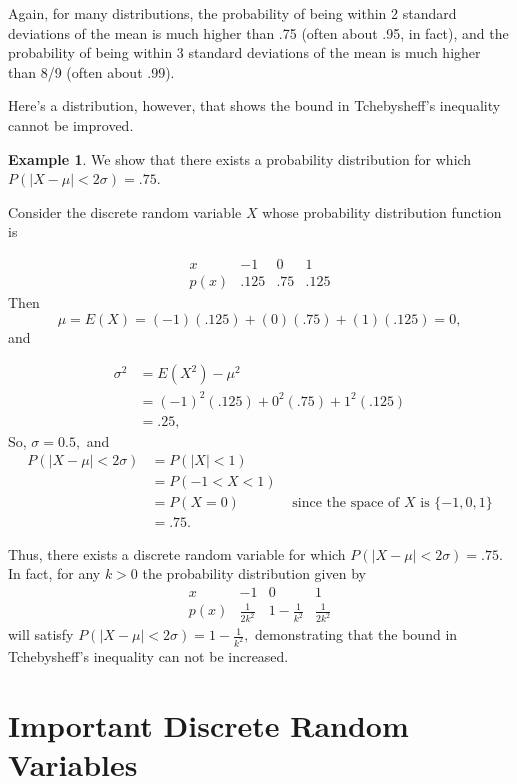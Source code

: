 \documentclass[
]{book}
\theoremstyle{definition}
\theoremstyle{definition}
\newtheorem{example}{Example}[chapter]
\theoremstyle{definition}
\theoremstyle{definition}
\theoremstyle{remark}
\begin{document}
Again, for many distributions, the probability of being within 2 standard deviations of the mean is much higher than .75 (often about .95, in fact), and the probability of being within 3 standard deviations of the mean is much higher than 8/9 (often about .99).

Here's a distribution, however, that shows the bound in Tchebysheff's inequality cannot be improved.

\begin{example}
\protect\hypertarget{exm:tcheby-best-bound}{}\label{exm:tcheby-best-bound}We show that there exists a probability distribution for which \(P(|X-\mu|<2\sigma) = .75\).

Consider the discrete random variable \(X\) whose probability distribution function is

\[
\begin{array}{c|c|c|c}
x   &  -1 &  0 &  1   \\ \hline
p(x) & .125 & .75 & .125 
\end{array}
\]
Then \[\mu = E(X) = (-1)(.125) + (0)(.75) + (1)(.125) = 0,\] and

\begin{align*}
\sigma^2 &= E(X^2)-\mu^2 \\
  &= (-1)^2(.125) + 0^2(.75) + 1^2(.125)\\
  &=.25,
\end{align*}
So, \(\sigma = 0.5,\) and
\begin{align*}
P(|X - \mu| < 2 \sigma) &= P(|X| < 1) \\
&= P(-1 < X < 1) \\
&= P(X = 0) & \text{ since the space of $X$ is } \{-1,0,1\} \\
&= .75.
\end{align*}

Thus, there exists a discrete random variable for which \(P(|X - \mu| < 2 \sigma) = .75\). In fact, for any \(k > 0\) the probability distribution given by
\[
\begin{array}{c|c|c|c}
x   &  -1 &  0 &  1   \\ \hline
p(x) & \frac{1}{2k^2} & 1-\frac{1}{k^2} & \frac{1}{2k^2} 
\end{array}
\]
will satisfy \(P(|X-\mu|<2\sigma)=1-\frac{1}{k^2},\) demonstrating that the bound in Tchebysheff's inequality can not be increased.
\end{example}

\chapter{Important Discrete Random Variables}\label{important-discrete-rv}
\end{document}
